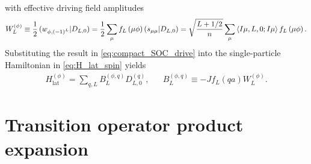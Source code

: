 \documentclass[nofootinbib,notitlepage,11pt]{revtex4-2}
\renewcommand{\t}{\text} %
\newcommand{\f}[2]{\dfrac{#1}{#2}} %
\newcommand{\p}[1]{\left(#1\right)} %
\newcommand{\bk}{\Braket} %
\newcommand{\1}{\mathds{1}}
\def\obk#1{\mathinner{({#1})}}
\begin{document}
with effective driving field amplitudes
\begin{align}
  W_L^{(\phi)}
  \equiv \f12 \obk{w_{\phi,\p{-1}^L}|D_{L,0}}
  = \f12 \sum_\mu f_L\p{\mu\phi} \obk{s_{\mu\mu}|D_{L,0}}
  = \sqrt{\f{L+1/2}{n}}
  \sum_\mu \bk{I\mu,L,0;I\mu} f_L\p{\mu\phi}.
\end{align}
Substituting the result in \eqref{eq:compact_SOC_drive} into the
single-particle Hamiltonian in \eqref{eq:H_lat_spin} yields
\begin{align}
  H_{\t{lat}}^{(\phi)} = \sum_{q,L} B_L^{(\phi,q)} D_{L,0}^{(q)},
  &&
  B_L^{(\phi,q)} \equiv -J f_L\p{qa} W_L^{(\phi)}.
\end{align}

\section{Transition operator product expansion}
\label{sec:trans_prod}
\end{document}
